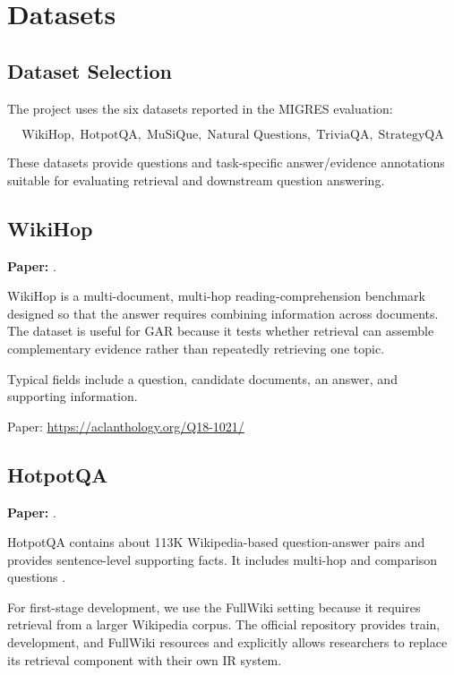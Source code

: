 \documentclass[11pt,a4paper]{article}
\begin{document}
\section{Datasets}

\subsection{Dataset Selection}

The project uses the six datasets reported in the MIGRES evaluation:

\[
\boxed{
\text{WikiHop},\;
\text{HotpotQA},\;
\text{MuSiQue},\;
\text{Natural Questions},\;
\text{TriviaQA},\;
\text{StrategyQA}
}
\]

These datasets provide questions and task-specific answer/evidence annotations suitable for evaluating retrieval and downstream question answering.

\subsection{WikiHop}

\textbf{Paper:} \citet{welbl-etal-2018-constructing}.

WikiHop is a multi-document, multi-hop reading-comprehension benchmark designed so that the answer requires combining information across documents. The dataset is useful for GAR because it tests whether retrieval can assemble complementary evidence rather than repeatedly retrieving one topic.

Typical fields include a question, candidate documents, an answer, and supporting information.

Paper:
\url{https://aclanthology.org/Q18-1021/}

\subsection{HotpotQA}

\textbf{Paper:} \citet{yang-etal-2018-hotpotqa}.

HotpotQA contains about 113K Wikipedia-based question-answer pairs and provides sentence-level supporting facts. It includes multi-hop and comparison questions \citep{yang-etal-2018-hotpotqa}.

For first-stage development, we use the FullWiki setting because it requires retrieval from a larger Wikipedia corpus. The official repository provides train, development, and FullWiki resources and explicitly allows researchers to replace its retrieval component with their own IR system.
\end{document}
